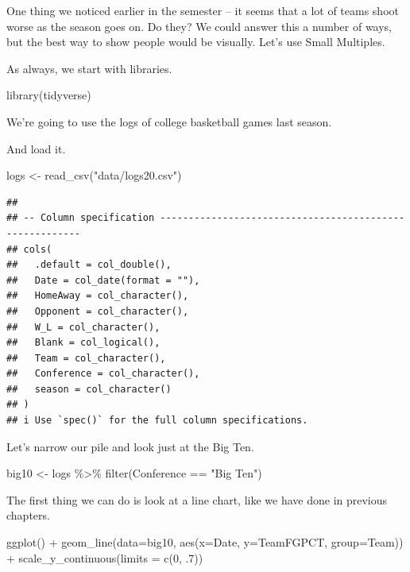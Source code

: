 \documentclass[
]{book}
\newenvironment{Shaded}{\begin{snugshade}}{\end{snugshade}}
\newcommand{\AttributeTok}[1]{\textcolor[rgb]{0.77,0.63,0.00}{#1}}
\newcommand{\DecValTok}[1]{\textcolor[rgb]{0.00,0.00,0.81}{#1}}
\newcommand{\FunctionTok}[1]{\textcolor[rgb]{0.00,0.00,0.00}{#1}}
\newcommand{\NormalTok}[1]{#1}
\newcommand{\OtherTok}[1]{\textcolor[rgb]{0.56,0.35,0.01}{#1}}
\newcommand{\SpecialCharTok}[1]{\textcolor[rgb]{0.00,0.00,0.00}{#1}}
\newcommand{\StringTok}[1]{\textcolor[rgb]{0.31,0.60,0.02}{#1}}
\begin{document}
One thing we noticed earlier in the semester -- it seems that a lot of teams shoot worse as the season goes on. Do they? We could answer this a number of ways, but the best way to show people would be visually. Let's use Small Multiples.

As always, we start with libraries.

\begin{Shaded}
\begin{Highlighting}[]
\FunctionTok{library}\NormalTok{(tidyverse)}
\end{Highlighting}
\end{Shaded}

We're going to use the logs of college basketball games last season.

And load it.

\begin{Shaded}
\begin{Highlighting}[]
\NormalTok{logs }\OtherTok{\textless{}{-}} \FunctionTok{read\_csv}\NormalTok{(}\StringTok{"data/logs20.csv"}\NormalTok{)}
\end{Highlighting}
\end{Shaded}

\begin{verbatim}
## 
## -- Column specification --------------------------------------------------------
## cols(
##   .default = col_double(),
##   Date = col_date(format = ""),
##   HomeAway = col_character(),
##   Opponent = col_character(),
##   W_L = col_character(),
##   Blank = col_logical(),
##   Team = col_character(),
##   Conference = col_character(),
##   season = col_character()
## )
## i Use `spec()` for the full column specifications.
\end{verbatim}

Let's narrow our pile and look just at the Big Ten.

\begin{Shaded}
\begin{Highlighting}[]
\NormalTok{big10 }\OtherTok{\textless{}{-}}\NormalTok{ logs }\SpecialCharTok{\%\textgreater{}\%} \FunctionTok{filter}\NormalTok{(Conference }\SpecialCharTok{==} \StringTok{"Big Ten"}\NormalTok{)}
\end{Highlighting}
\end{Shaded}

The first thing we can do is look at a line chart, like we have done in previous chapters.

\begin{Shaded}
\begin{Highlighting}[]
\FunctionTok{ggplot}\NormalTok{() }\SpecialCharTok{+} 
  \FunctionTok{geom\_line}\NormalTok{(}\AttributeTok{data=}\NormalTok{big10, }\FunctionTok{aes}\NormalTok{(}\AttributeTok{x=}\NormalTok{Date, }\AttributeTok{y=}\NormalTok{TeamFGPCT, }\AttributeTok{group=}\NormalTok{Team)) }\SpecialCharTok{+} 
  \FunctionTok{scale\_y\_continuous}\NormalTok{(}\AttributeTok{limits =} \FunctionTok{c}\NormalTok{(}\DecValTok{0}\NormalTok{, .}\DecValTok{7}\NormalTok{))}
\end{Highlighting}
\end{Shaded}
\end{document}
